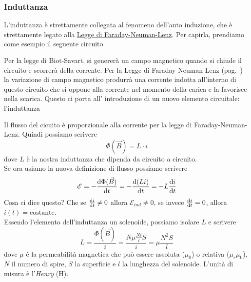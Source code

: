 \subsubsection{Induttanza}
L'induttanza è strettamente collegata al fenomeno dell'auto induzione, che è strettamente legato
alla \hyperref[subsec:mag:fnl]{Legge di Faraday-Neuman-Lenz}. Per capirla, prendiamo come
esempio il seguente circuito
\begin{center}
\end{center}
Per la legge di Biot-Savart, si genererà un campo magnetico quando si chiude il circuito e scorrerà
della corrente. Per la Legge di Faraday-Neuman-Lenz (pag.~\pageref{subsec:mag:fnl}) 
la variazione di campo magnetico produrrà una corrente indotta all'interno di questo circuito che 
si oppone alla corrente nel momento della carica e la favorisce nella scarica. Questo ci porta all'
introduzione di un nuovo elemento circuitale: l'induttanza
\begin{center}
\end{center}
Il flusso del cicuito è proporzionale alla corrente per la legge di Faraday-Neuman-Lenz. Quindi
possiamo scrivere
\begin{equation*}
  \Phi(\vec{B}) = L\cdot i
\end{equation*}
dove $L$ è la nostra induttanza che dipenda da circuito a circuito.\\
Se ora usiamo la nuova definizione di flusso possiamo scrivere
\begin{equation*}
  \mathcal{E} = -\frac{\mathop{}\!\mathrm{d} \Phi(\vec{B})}{\mathop{}\!\mathrm{d} t} = -\frac{\mathop{}\!\mathrm{d} (Li)}{\mathop{}\!\mathrm{d} t} = 
  -L\frac{\mathop{}\!\mathrm{d} i}{\mathop{}\!\mathrm{d} t} 
\end{equation*}
Cosa ci dice questo? Che se $\frac{\mathop{}\!\mathrm{d} i}{\mathop{}\!\mathrm{d} t}\neq0$ allora $\mathcal{E}_{ind}\neq0$, se invece
$\frac{\mathop{}\!\mathrm{d} i}{\mathop{}\!\mathrm{d} t}=0$, allora $i(t)=\text{costante}$.\\
Essendo l'elemento dell'induttanza un solenoide, possiamo isolare $L$ e scrivere
\begin{equation*}
  L = \frac{\Phi(\vec{B})}{i} = \frac{N\mu\frac{Ni}{l}S}{i} = \mu\frac{N^2S}{l}
\end{equation*}
dove $\mu$ è la permeabilità magnetica che può essere assoluta (\hyperref[tab:mu0]{$\mu_0$}) o
relativa ($\mu_r\mu_0$), $N$ il numero di spire, $S$ la superficie e $l$ la lunghezza del 
solenoide. L'unità di misura è l'\textit{Henry} (H).

